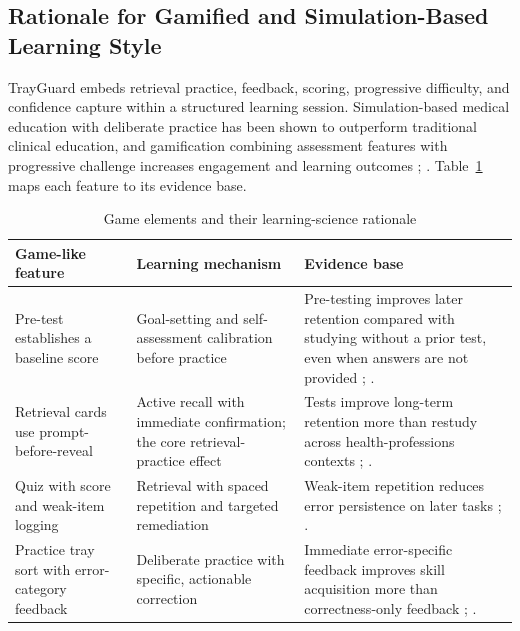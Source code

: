 \documentclass[10pt,a4paper]{article}
\begin{document}
\subsection{Rationale for Gamified and Simulation-Based Learning Style}

TrayGuard embeds retrieval practice, feedback, scoring, progressive difficulty,
and confidence capture within a structured learning session. Simulation-based
medical education with deliberate practice has been shown to outperform
traditional clinical education, and gamification combining assessment features
with progressive challenge increases engagement and learning outcomes
\cite{cook-et-al-2011};
\cite{van-gaalen-et-al-2021}. Table~\ref{tab:game-elements-and-their-learning-science-rationale}
maps each feature to its evidence base.

\begin{table}[H]
\centering
\caption{Game elements and their learning-science rationale}
\label{tab:game-elements-and-their-learning-science-rationale}
\small\renewcommand{\arraystretch}{1.2}\setlength{\tabcolsep}{4pt}
\begin{tabularx}{\textwidth}{|>{\raggedright\arraybackslash}X|>{\raggedright\arraybackslash}X|>{\raggedright\arraybackslash}X|}
\hline
Game-like feature & Learning mechanism & Evidence base \\
\hline
Pre-test establishes a baseline score & Goal-setting and self-assessment calibration before practice & Pre-testing improves later retention compared with studying without a prior test, even when answers are not provided \cite{roediger-and-karpicke-2006}; \cite{larsen-et-al-2009}. \\
\hline
Retrieval cards use prompt-before-reveal & Active recall with immediate confirmation; the core retrieval-practice effect & Tests improve long-term retention more than restudy across health-professions contexts \cite{dunlosky-et-al-2013}; \cite{barrison-et-al-2025}. \\
\hline
Quiz with score and weak-item logging & Retrieval with spaced repetition and targeted remediation & Weak-item repetition reduces error persistence on later tasks \cite{ofstead-et-al-2023}; \cite{hattie-and-timperley-2007}. \\
\hline
Practice tray sort with error-category feedback & Deliberate practice with specific, actionable correction & Immediate error-specific feedback improves skill acquisition more than correctness-only feedback \cite{hattie-and-timperley-2007}; \cite{issenberg-et-al-2005}. \\

\end{tabularx}
\end{table}
\end{document}
